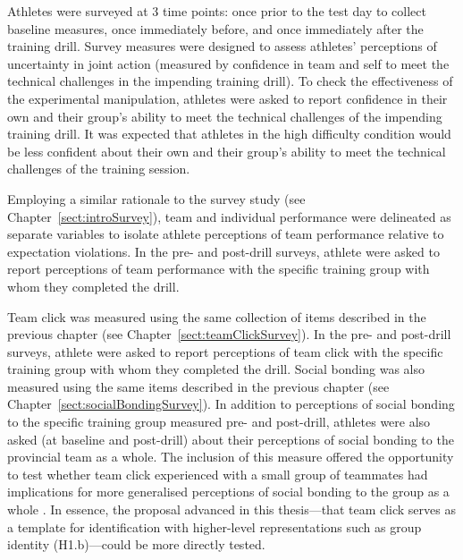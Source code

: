 \begin{CJK}{UTF8}{gbsn}
Athletes were surveyed at 3 time points: once prior to the test day to collect baseline measures, once immediately before, and once immediately after the training drill.  Survey measures were designed to assess athletes’ perceptions of uncertainty in joint action (measured by confidence in team and self to meet the technical challenges in the impending training drill).  To check the effectiveness of the experimental manipulation, athletes were asked to report confidence in their own and their group's ability to meet the technical challenges of the impending training drill.  It was expected that athletes in the high difficulty condition would be less confident about their own and their group's ability to meet the technical challenges of the training session.

Employing a similar rationale to the survey study (see Chapter~\ref{sect:introSurvey}), team and individual performance were delineated as separate variables   to isolate athlete perceptions of team performance relative to expectation violations.  In the pre- and post-drill surveys, athlete were asked to report perceptions of team performance with the specific training group with whom they completed the drill.

Team click was measured using the same collection of items described in the previous chapter (see Chapter~\ref{sect:teamClickSurvey}).  In the pre- and post-drill surveys, athlete were asked to report perceptions of team click with the specific training group with whom they completed the drill.  Social bonding was also measured using the same items described in the previous chapter (see Chapter~\ref{sect:socialBondingSurvey}).  In addition to perceptions of social bonding to the specific training group measured pre- and post-drill, athletes were also asked (at baseline and post-drill) about their perceptions of social bonding to the provincial team as a whole.  The inclusion of this measure offered the opportunity to test whether team click experienced with a small group of teammates had implications for more generalised perceptions of social bonding to the group as a whole \citep[see, for example][]{Reddish2013a,Swann2010}.  In essence, the proposal advanced in this thesis---that team click serves as a template for identification with higher-level representations such as group identity (H1.b)---could be more directly tested.


\end{CJK}
